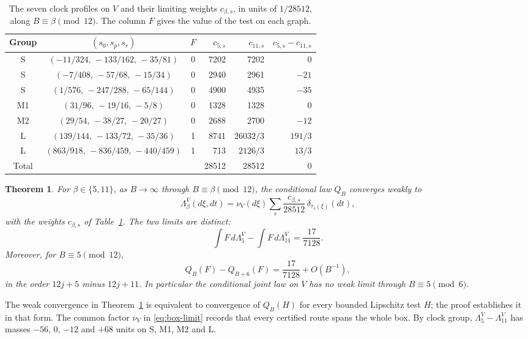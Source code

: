 \documentclass[11pt,reqno]{amsart}
\newtheorem{theorem}{Theorem}
\theoremstyle{remark}
\begin{document}
\begin{table}[htbp]
\small
\renewcommand{\arraystretch}{1.15}
\centering
\begin{tabular}{@{}cccrrr@{}}
\hline
Group & \((s_0,s_p,s_r)\) & \(F\) & \(c_{5,s}\) & \(c_{11,s}\) & \(c_{5,s}-c_{11,s}\)\\
\hline
S & \((-11/324,\,-133/162,\,-35/81)\) & 0 & 7202 & 7202 & 0\\
S & \((-7/408,\,-57/68,\,-15/34)\) & 0 & 2940 & 2961 & \(-21\)\\
S & \((1/576,\,-247/288,\,-65/144)\) & 0 & 4900 & 4935 & \(-35\)\\
M1 & \((31/96,\,-19/16,\,-5/8)\) & 0 & 1328 & 1328 & 0\\
M2 & \((29/54,\,-38/27,\,-20/27)\) & 0 & 2688 & 2700 & \(-12\)\\
L & \((139/144,\,-133/72,\,-35/36)\) & 1 & 8741 & \(26032/3\) & \(191/3\)\\
L & \((863/918,\,-836/459,\,-440/459)\) & 1 & 713 & \(2126/3\) & \(13/3\)\\
\hline
Total & & & 28512 & 28512 & 0\\
\hline
\end{tabular}
\caption{The seven clock profiles on \(V\) and their limiting weights \(c_{\beta,s}\), in units of \(1/28512\), along \(B\equiv\beta\pmod{12}\). The column \(F\) gives the value of the test on each graph.}\label{tab:box-limits}
\end{table}

\begin{theorem}\label{th:box}
For \(\beta\in\{5,11\}\), as \(B\to\infty\) through \(B\equiv\beta\pmod{12}\), the conditional law \(Q_B\) converges weakly to
\begin{equation}\label{eq:box-limit}
 \Lambda^V_\beta(d\xi,dt)=\nu_V(d\xi)\sum_s\frac{c_{\beta,s}}{28512}\,\delta_{\tau_s(\xi)}(dt),
\end{equation}
with the weights \(c_{\beta,s}\) of Table~\ref{tab:box-limits}. The two limits are distinct:
\[
 \int F\,d\Lambda^V_5-\int F\,d\Lambda^V_{11}=\frac{17}{7128}.
\]
Moreover, for \(B\equiv5\pmod{12}\),
\[
 Q_B(F)-Q_{B+6}(F)=\frac{17}{7128}+O(B^{-1}),
\]
in the order \(12j+5\) minus \(12j+11\). In particular the conditional joint law on \(V\) has no weak limit through \(B\equiv5\pmod6\).
\end{theorem}

The weak convergence in Theorem~\ref{th:box} is equivalent to convergence of \(Q_B(H)\) for every bounded Lipschitz test \(H\); the proof establishes it in that form. The common factor \(\nu_V\) in \eqref{eq:box-limit} records that every certified route spans the whole box. By clock group, \(\Lambda^V_5-\Lambda^V_{11}\) has masses \(-56\), \(0\), \(-12\) and \(+68\) units on S, M1, M2 and L.
\end{document}
